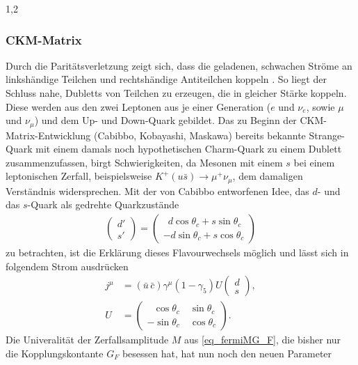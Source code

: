 \documentclass[11pt,a4paper,twoside]{report}
\begin{document}
\begin{spacing}{1,2}
\subsubsection{CKM-Matrix}
Durch die Paritätsverletzung zeigt sich, dass die geladenen, schwachen Ströme an linkshändige Teilchen und rechtshändige Antiteilchen koppeln \cite{DissForm}\cite{Sibold}. 
So liegt der Schluss nahe, Dubletts von Teilchen zu erzeugen, die in gleicher Stärke koppeln. Diese werden aus den zwei Leptonen aus je einer Generation 
($e$ und $\nu_e$, sowie $\mu$ und $\nu_\mu$) und dem Up- und Down-Quark gebildet. Das zu Beginn der CKM-Matrix-Entwicklung (Cabibbo, Kobayashi, Maskawa) 
bereits bekannte Strange-Quark
mit einem damals noch hypothetischen Charm-Quark zu einem Dublett zusammenzufassen, birgt Schwierigkeiten, da Mesonen mit einem $s$ bei einem leptonischen
Zerfall, beispielsweise $K^+(u\bar s) \rightarrow \mu^+ \nu_\mu$, dem damaligen Verständnis widersprechen. Mit der von Cabibbo entworfenen Idee, das $d$-
und das $s$-Quark als gedrehte Quarkzustände 
\begin{align}
 \begin{pmatrix}
  d'\\
  s'
 \end{pmatrix} = \begin{pmatrix}
		  \,\,\,d \cos \theta_c + s \sin \theta_c\\
		  -d \sin \theta_c + s\cos \theta_c
		  \end{pmatrix}
\end{align}
zu betrachten, ist die Erklärung dieses Flavourwechsels möglich und lässt sich in folgendem Strom ausdrücken
\begin{align}
 j^\mu &= (\bar u\, \bar c) \gamma^\mu (1-\gamma_5) U \begin{pmatrix}
                                                      d\\
                                                      s
                                                     \end{pmatrix},\\
 U &= \begin{pmatrix}
      \,\,\,\,\cos \theta_c\quad \sin \theta_c\\
      -\sin \theta_c\quad \cos \theta_c
     \end{pmatrix}.
\end{align}
Die Univeralität der Zerfallsamplitude $M$ aus \eqref{eq_fermiMG_F}, die bisher nur die Kopplungskontante $G_F$ besessen hat, hat nun noch den neuen Parameter

\end{spacing}
\end{document}
